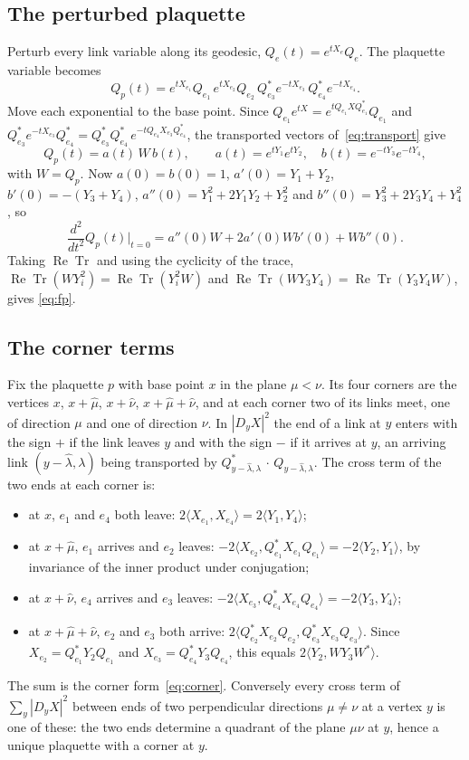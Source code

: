 \documentclass[aps,prd,twocolumn,superscriptaddress,nofootinbib,longbibliography,floatfix,amsmath,amssymb,10pt]{revtex4-2}
\theoremstyle{definition}
\theoremstyle{remark}
\newcommand{\ReTr}{\operatorname{Re}\operatorname{Tr}}
\newcommand{\ip}[2]{\langle #1,#2\rangle}
\begin{document}
\subsection{The perturbed plaquette}

Perturb every link variable along its geodesic, $Q_e(t)=e^{tX_e}Q_e$. The
plaquette variable becomes
\[
Q_p(t)=e^{tX_{e_1}}Q_{e_1}\,e^{tX_{e_2}}Q_{e_2}\,Q_{e_3}^*e^{-tX_{e_3}}\,
Q_{e_4}^*e^{-tX_{e_4}} .
\]
Move each exponential to the base point. Since $Q_{e_1}e^{tX}=
e^{tQ_{e_1}XQ_{e_1}^*}Q_{e_1}$ and $Q_{e_3}^*e^{-tX_{e_3}}Q_{e_4}^*=
Q_{e_3}^*Q_{e_4}^*\,e^{-tQ_{e_4}X_{e_3}Q_{e_4}^*}$, the transported vectors
of~\eqref{eq:transport} give
\[
Q_p(t)=a(t)\,W\,b(t),\qquad a(t)=e^{tY_1}e^{tY_2},\quad b(t)=e^{-tY_3}
e^{-tY_4},
\]
with $W=Q_p$. Now $a(0)=b(0)=1$, $a'(0)=Y_1+Y_2$, $b'(0)=-(Y_3+Y_4)$,
$a''(0)=Y_1^2+2Y_1Y_2+Y_2^2$ and $b''(0)=Y_3^2+2Y_3Y_4+Y_4^2$, so
\[
\frac{d^2}{dt^2}Q_p(t)\Big|_{t=0}=a''(0)W+2a'(0)Wb'(0)+Wb''(0).
\]
Taking $\ReTr$ and using the cyclicity of the trace,
$\ReTr(WY_i^2)=\ReTr(Y_i^2W)$ and $\ReTr(WY_3Y_4)=\ReTr(Y_3Y_4W)$, gives
\eqref{eq:fp}.

\subsection{The corner terms}

Fix the plaquette $p$ with base point $x$ in the plane $\mu<\nu$. Its four
corners are the vertices $x$, $x+\hat\mu$, $x+\hat\nu$, $x+\hat\mu+\hat\nu$,
and at each corner two of its links meet, one of direction $\mu$ and one of
direction $\nu$. In $|D_yX|^2$ the end of a link at $y$ enters with the sign
$+$ if the link leaves $y$ and with the sign $-$ if it arrives at $y$, an
arriving link $(y-\hat\lambda,\lambda)$ being transported by
$Q_{y-\hat\lambda,\lambda}^*\,\cdot\,Q_{y-\hat\lambda,\lambda}$. The cross term
of the two ends at each corner is:
\begin{itemize}[leftmargin=*]
\item at $x$, $e_1$ and $e_4$ both leave: $2\ip{X_{e_1}}{X_{e_4}}=2\ip{Y_1}
{Y_4}$;
\item at $x+\hat\mu$, $e_1$ arrives and $e_2$ leaves:
$-2\ip{X_{e_2}}{Q_{e_1}^*X_{e_1}Q_{e_1}}=-2\ip{Y_2}{Y_1}$, by invariance of
the inner product under conjugation;
\item at $x+\hat\nu$, $e_4$ arrives and $e_3$ leaves:
$-2\ip{X_{e_3}}{Q_{e_4}^*X_{e_4}Q_{e_4}}=-2\ip{Y_3}{Y_4}$;
\item at $x+\hat\mu+\hat\nu$, $e_2$ and $e_3$ both arrive:
$2\ip{Q_{e_2}^*X_{e_2}Q_{e_2}}{Q_{e_3}^*X_{e_3}Q_{e_3}}$. Since
$X_{e_2}=Q_{e_1}^*Y_2Q_{e_1}$ and $X_{e_3}=Q_{e_4}^*Y_3Q_{e_4}$, this
equals $2\ip{Y_2}{WY_3W^*}$.
\end{itemize}
The sum is the corner form~\eqref{eq:corner}. Conversely every cross term of
$\sum_y|D_yX|^2$ between ends of two perpendicular directions $\mu\ne\nu$ at a
vertex $y$ is one of these: the two ends determine a quadrant of the plane
$\mu\nu$ at $y$, hence a unique plaquette with a corner at $y$.
\end{document}
